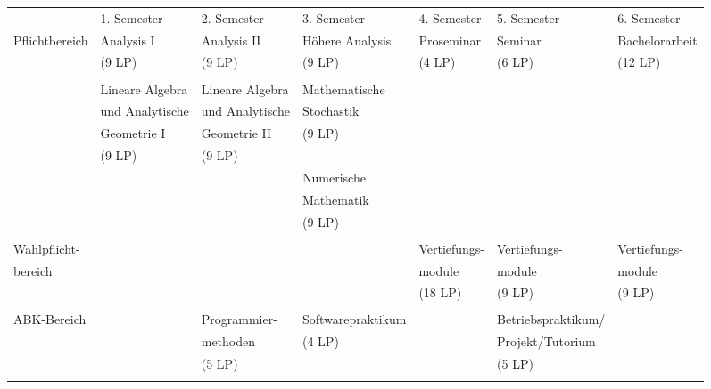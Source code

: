 \begin{center}
\begin{tabular}{||l||l|l|l|l|l|l||}
\hhline{|t:=:t:=t=t=t=t=t=:t|}
\hspace*{25mm} & 1. Semester\hspace*{8ex} & 2. Semester\hspace*{8ex} & 3. Semester\hspace*{8ex} & 
4. Semester\hspace*{8ex} & 5. Semester\hspace*{8ex} & 6. Semester\hspace*{8ex} \\
\hhline{|:=::======:|}
Pflichtbereich & Analysis I& Analysis II&Höhere Analysis& Proseminar &Seminar& Bachelorarbeit\\
\hhline{||~||~|~|~|~|~|~||} &(9 LP)&(9 LP)&(9 LP)&(4 LP) &(6 LP)& (12 LP)\\
\hhline{||~||~|~|~|~|~|~||} &&&&&&\\
\hhline{||~||~|~|~|~|~|~||} &Lineare Algebra & Lineare Algebra & Mathematische & & &\\ 
\hhline{||~||~|~|~|~|~|~||} &und Analytische & und Analytische & Stochastik & & &\\ 
\hhline{||~||~|~|~|~|~|~||} &Geometrie I&Geometrie II & (9 LP) & &&\\ 
\hhline{||~||~|~|~|~|~|~||} &(9 LP)&(9 LP)& &&&\\
\hhline{||~||~|~|~|~|~|~||} &&&Numerische&&&\\
\hhline{||~||~|~|~|~|~|~||} &&&Mathematik&&&\\
\hhline{||~||~|~|~|~|~|~||} &&&(9 LP)&&&\\ 
\hhline{||~||~|~|~|~|~|~||} &&&&&&\\
\hhline{|:=::======:|}
\hhline{||~||~|~|~|~|~|~||} Wahlpflicht-&&&&Vertiefungs-&Vertiefungs-&Vertiefungs- \\
\hhline{||~||~|~|~|~|~|~||} bereich&&&&module&module&module \\
\hhline{||~||~|~|~|~|~|~||} &&&&(18 LP)&(9 LP)&(9 LP) \\
\hhline{||~||~|~|~|~|~|~||} &&&&&&\\
\hhline{|:=::======:|}
ABK-Bereich&& Programmier-&Softwarepraktikum&&Betriebspraktikum/& \\
\hhline{||~||~|~|~|~|~|~||} &&methoden&(4 LP)&&Projekt/Tutorium&\\
\hhline{||~||~|~|~|~|~|~||} &&(5 LP)&&&(5 LP)&\\
\hhline{||~||~|~|~|~|~|~||} &&&&&&\\

\end{tabular}
\end{center}
